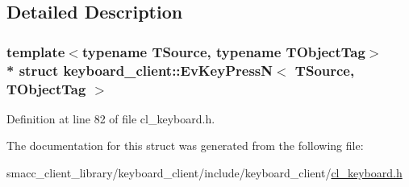 \subsection{Detailed Description}
\subsubsection*{template$<$typename T\+Source, typename T\+Object\+Tag$>$\\*
struct keyboard\+\_\+client\+::\+Ev\+Key\+Press\+N$<$ T\+Source, T\+Object\+Tag $>$}



Definition at line 82 of file cl\+\_\+keyboard.\+h.



The documentation for this struct was generated from the following file\+:\begin{DoxyCompactItemize}
\item 
smacc\+\_\+client\+\_\+library/keyboard\+\_\+client/include/keyboard\+\_\+client/\hyperlink{cl__keyboard_8h}{cl\+\_\+keyboard.\+h}\end{DoxyCompactItemize}

